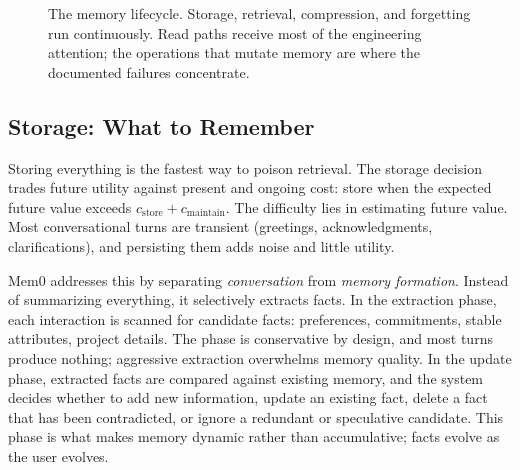 \documentclass[11pt]{book}
\begin{document}
\begin{figure}[htbp]
\centering
{}
\caption{The memory lifecycle. Storage, retrieval, compression, and forgetting run continuously. Read paths receive most of the engineering attention; the operations that mutate memory are where the documented failures concentrate.}
\label{fig:memory-ops}
\end{figure}

\subsection{Storage: What to Remember}

Storing everything is the fastest way to poison retrieval. The storage decision trades future utility against present and ongoing cost: store when the expected future value exceeds $c_{\text{store}} + c_{\text{maintain}}$. The difficulty lies in estimating future value. Most conversational turns are transient (greetings, acknowledgments, clarifications), and persisting them adds noise and little utility.

Mem0 \cite{mem0_2025} addresses this by separating \textit{conversation} from \textit{memory formation}. Instead of summarizing everything, it selectively extracts facts. In the extraction phase, each interaction is scanned for candidate facts: preferences, commitments, stable attributes, project details. The phase is conservative by design, and most turns produce nothing; aggressive extraction overwhelms memory quality. In the update phase, extracted facts are compared against existing memory, and the system decides whether to add new information, update an existing fact, delete a fact that has been contradicted, or ignore a redundant or speculative candidate. This phase is what makes memory dynamic rather than accumulative; facts evolve as the user evolves.
\end{document}
